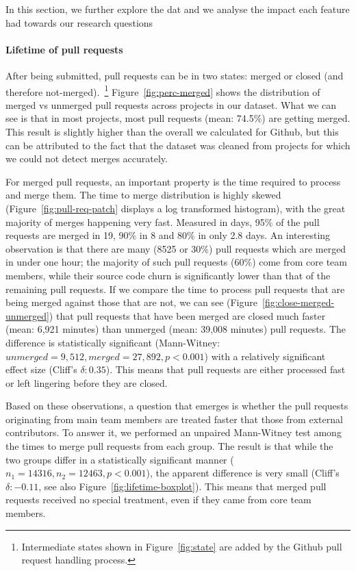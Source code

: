 \documentclass{sig-alternate}
\begin{document}
In this section, we further explore the dat
and we analyse the impact each feature had towards our research questions 

\paragraph*{Lifetime of pull requests}

After being submitted, pull requests can be in two states: merged or closed
(and therefore not-merged).~\footnote{Intermediate states shown in
Figure~\ref{fig:state} are added by the Github pull request handling process.} 
Figure~\ref{fig:perc-merged} shows the distribution of merged vs unmerged
pull requests across projects in our dataset. What we can see is that
in most projects, most pull requests (mean: 74.5\%) are getting
merged. This result is slightly higher than the overall we calculated for
Github, but this can be attributed to the fact that the dataset was cleaned
from projects for which we could not detect merges accurately. 

For merged pull requests, an important property is the time required to process
and merge them. The time to merge distribution is highly skewed
(Figure~\ref{fig:pull-req-patch} displays a log transformed histogram), with the
great majority of merges happening very fast. Measured in days, 95\% of the pull
requests are merged in 19, 90\% in 8 and 80\% in only 2.8 days. An interesting
observation is that there are many (8525 or 30\%) pull requests which are merged
in under one hour; the majority of such pull requests (60\%) come from core team
members, while their source code churn is significantly lower than that of the
remaining pull requests. If we compare the time to process pull requests that
are being merged against those that are not, we can see
(Figure~\ref{fig:close-merged-unmerged}) that pull requests that have been
merged are closed much faster (mean: 6,921 minutes) than unmerged (mean: 39,008 minutes) pull requests. The difference is
statistically significant (Mann-Witney: $unmerged = 9,512, merged = 27,892, p < 0.001$) with a relatively
significant effect size (Cliff's $\delta: 0.35$).
This means that pull requests are either processed fast or left lingering 
before they are closed.

Based on these observations, a question that emerges is
whether the pull requests originating from main team members are treated faster
that those from external contributors. To answer it, we performed an unpaired
Mann-Witney test among the times to merge pull requests from each group. The
result is that while the two groups differ in a statistically significant manner
($n_1 = 14316, n_2 = 12463, p < 0.001$), the apparent difference is very small
(Cliff's $\delta: -0.11$, see also Figure~\ref{fig:lifetime-boxplot}). This
means that merged pull requests received no special treatment, even if they came
from core team members.
\end{document}
